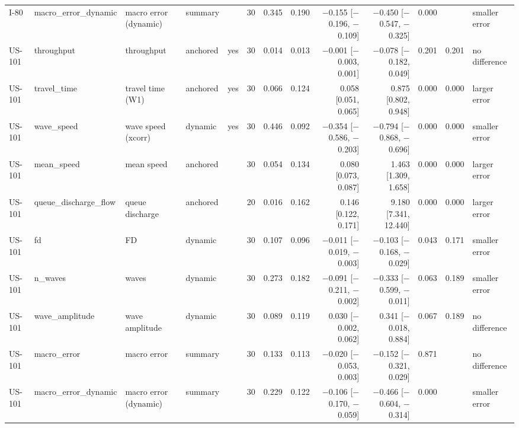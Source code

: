 \begin{table}[htbp]
{\begin{tabular}{lllllrrrrrrrl}
I-80 & macro\_error\_dynamic & macro error (dynamic) & summary &  & 30 & 0.345 & 0.190 & $-$0.155 [$-$0.196, $-$0.109] & $-$0.450 [$-$0.547, $-$0.325] & 0.000 &  & smaller error \\
US-101 & throughput & throughput & anchored & yes & 30 & 0.014 & 0.013 & $-$0.001 [$-$0.003, 0.001] & $-$0.078 [$-$0.182, 0.049] & 0.201 & 0.201 & no difference \\
US-101 & travel\_time & travel time (W1) & anchored & yes & 30 & 0.066 & 0.124 & 0.058 [0.051, 0.065] & 0.875 [0.802, 0.948] & 0.000 & 0.000 & larger error \\
US-101 & wave\_speed & wave speed (xcorr) & dynamic & yes & 30 & 0.446 & 0.092 & $-$0.354 [$-$0.586, $-$0.203] & $-$0.794 [$-$0.868, $-$0.696] & 0.000 & 0.000 & smaller error \\
US-101 & mean\_speed & mean speed & anchored &  & 30 & 0.054 & 0.134 & 0.080 [0.073, 0.087] & 1.463 [1.309, 1.658] & 0.000 & 0.000 & larger error \\
US-101 & queue\_discharge\_flow & queue discharge & anchored &  & 20 & 0.016 & 0.162 & 0.146 [0.122, 0.171] & 9.180 [7.341, 12.440] & 0.000 & 0.000 & larger error \\
US-101 & fd & FD & dynamic &  & 30 & 0.107 & 0.096 & $-$0.011 [$-$0.019, $-$0.003] & $-$0.103 [$-$0.168, $-$0.029] & 0.043 & 0.171 & smaller error \\
US-101 & n\_waves & waves & dynamic &  & 30 & 0.273 & 0.182 & $-$0.091 [$-$0.211, $-$0.002] & $-$0.333 [$-$0.599, $-$0.011] & 0.063 & 0.189 & smaller error \\
US-101 & wave\_amplitude & wave amplitude & dynamic &  & 30 & 0.089 & 0.119 & 0.030 [$-$0.002, 0.062] & 0.341 [$-$0.018, 0.884] & 0.067 & 0.189 & no difference \\
US-101 & macro\_error & macro error & summary &  & 30 & 0.133 & 0.113 & $-$0.020 [$-$0.053, 0.003] & $-$0.152 [$-$0.321, 0.029] & 0.871 &  & no difference \\
US-101 & macro\_error\_dynamic & macro error (dynamic) & summary &  & 30 & 0.229 & 0.122 & $-$0.106 [$-$0.170, $-$0.059] & $-$0.466 [$-$0.604, $-$0.314] & 0.000 &  & smaller error \\
\bottomrule
\end{tabular}
}
\end{table}
